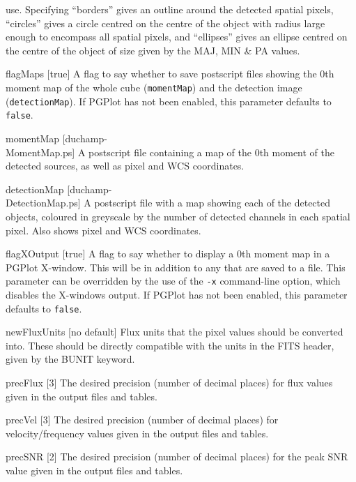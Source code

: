 \begin{Lentry}
  use. Specifying ``borders'' gives an outline around the detected
  spatial pixels, ``circles'' gives a circle centred on the
  centre of the object with radius large enough to encompass all
  spatial pixels, and ``ellipses'' gives an ellipse centred on the
  centre of the object of size given by the MAJ, MIN \& PA values. 
\item[{flagMaps [true]}] A flag to say whether to save postscript
  files showing the 0th moment map of the whole cube
  (\texttt{momentMap}) and the detection image
  (\texttt{detectionMap}). If PGPlot has not been enabled, this
  parameter defaults to \texttt{false}.
\item[{momentMap [duchamp-\\MomentMap.ps]}] A postscript file
  containing a map of the 0th moment of the detected sources, as well
  as pixel and WCS coordinates.
\item[{detectionMap [duchamp-\\DetectionMap.ps]}] A postscript
  file with a map showing each of the detected objects, coloured in
  greyscale by the number of detected channels in each spatial
  pixel. Also shows pixel and WCS coordinates.
\item[{flagXOutput [true]}] A flag to say whether to display a
  0th moment map in a PGPlot X-window. This will be in addition to any
  that are saved to a file. This parameter can be overridden by the
  use of the \texttt{-x} command-line option, which disables the
  X-windows output. If PGPlot has not been enabled, this parameter
  defaults to \texttt{false}.
\item[{newFluxUnits [no default]}] Flux units that the pixel values
  should be converted into. These should be directly compatible with
  the units in the FITS header, given by the BUNIT keyword.
\item[{precFlux [3]}] The desired precision (\ie number of decimal
  places) for flux values given in the output files and tables.
\item[{precVel [3]}] The desired precision (\ie number of decimal
  places) for velocity/frequency values given in the output files and
  tables.
\item[{precSNR [2]}] The desired precision (\ie number of decimal
  places) for the peak SNR value given in the output files and tables.
\end{Lentry}

